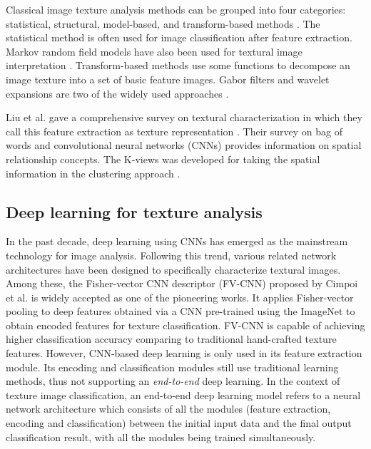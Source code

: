 \documentclass{aci}
\numberwithin{equation}{section}
\begin{document}
Classical image texture analysis methods can be grouped into four categories:
statistical, structural, model-based, and transform-based methods
\cite{bharati_image_2004}. The statistical method is often used for image
classification after feature extraction. Markov random field models have also
been used for textural image interpretation \cite{hassner_use_1981,
    cross_markov_1983}. Transform-based methods use some functions to decompose an
image texture into a set of basic feature images. Gabor filters and wavelet
expansions are two of the widely used approaches \cite{bovik_multichannel_1990}.

Liu et al. gave a comprehensive survey on textural characterization in which
they call this feature extraction as texture representation \cite{liu_bow_2019}.
Their survey on bag of words and convolutional neural networks (CNNs)
\cite{krizhevsky_imagenet_2017} provides information on spatial relationship
concepts. The K-views was developed for taking the spatial information in the
clustering approach \cite{hung_image_2019}.

\subsection{Deep learning for texture analysis}

In the past decade, deep learning using CNNs has emerged as the mainstream
technology for image analysis. Following this trend, various related network
architectures have been designed to specifically characterize textural images.
Among these, the Fisher-vector CNN descriptor (FV-CNN) proposed by Cimpoi et al.
\cite{cimpoi_deep_2015} is widely accepted as one of the pioneering works. It
applies Fisher-vector pooling to deep features obtained via a CNN pre-trained
using the ImageNet \cite{krizhevsky_imagenet_2017} to obtain encoded features
for texture classification. FV-CNN is capable of achieving higher classification
accuracy comparing to traditional hand-crafted texture features. However,
CNN-based deep learning is only used in its feature extraction module. Its
encoding and classification modules still use traditional learning methods, thus
not supporting an \textit{end-to-end} deep learning. In the context of texture
image classification, an end-to-end deep learning model refers to a neural
network architecture which consists of all the modules (feature extraction,
encoding and classification) between the initial input data and the final output
classification result, with all the modules being trained simultaneously.
\end{document}
